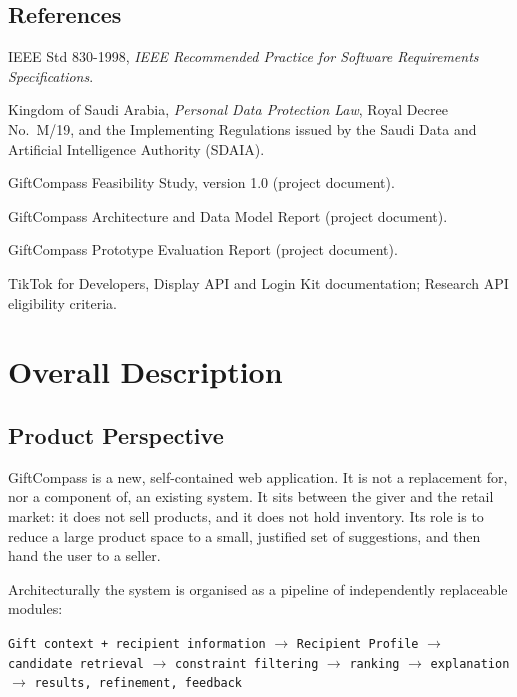 \documentclass[11pt,a4paper]{report}
\begin{document}
\section{References}
\begin{enumerate}[label={[R\arabic*]}]
  \item IEEE Std 830-1998, \emph{IEEE Recommended Practice for Software Requirements
        Specifications}.
  \item Kingdom of Saudi Arabia, \emph{Personal Data Protection Law}, Royal Decree No.~M/19,
        and the Implementing Regulations issued by the Saudi Data and Artificial Intelligence
        Authority (SDAIA).
  \item GiftCompass Feasibility Study, version 1.0 (project document).
  \item GiftCompass Architecture and Data Model Report (project document).
  \item GiftCompass Prototype Evaluation Report (project document).
  \item TikTok for Developers, Display API and Login Kit documentation; Research API
        eligibility criteria.
\end{enumerate}

\chapter{Overall Description}

\section{Product Perspective}
GiftCompass is a new, self-contained web application. It is not a replacement for, nor a
component of, an existing system. It sits between the giver and the retail market: it does
not sell products, and it does not hold inventory. Its role is to reduce a large product
space to a small, justified set of suggestions, and then hand the user to a seller.

Architecturally the system is organised as a pipeline of independently replaceable modules:

\begin{center}
\small
\texttt{Gift context + recipient information} $\rightarrow$ \texttt{Recipient Profile}
$\rightarrow$ \texttt{candidate retrieval} $\rightarrow$ \texttt{constraint filtering}
$\rightarrow$ \texttt{ranking} $\rightarrow$ \texttt{explanation} $\rightarrow$
\texttt{results, refinement, feedback}
\end{center}
\end{document}
